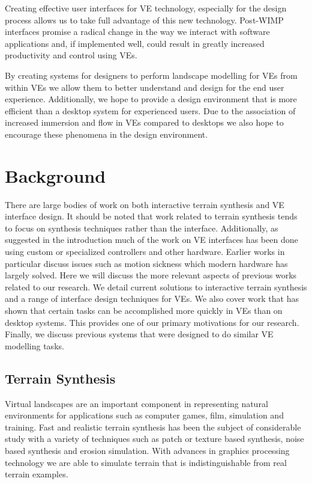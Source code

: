 \documentclass{sig-alternate-05-2015}
\begin{document}
Creating effective user interfaces for VE technology, especially for the design process allows us to take full advantage of this new technology. Post-WIMP interfaces promise a radical change in the way we interact with software applications and, if implemented well, could result in greatly increased productivity and control using VEs.
 
 By creating systems for designers to perform landscape modelling for VEs from within VEs we allow them to better understand and design for the end user experience. Additionally, we hope to provide a design environment that is more efficient than a desktop system for experienced users. Due to the association of increased immersion and flow in VEs compared to desktops\cite{Schubert2001} we also hope to encourage these phenomena in the design environment.
\section{Background}
There are large bodies of work on both interactive terrain synthesis and VE interface design. It should be noted that work related to terrain synthesis tends to focus on synthesis techniques rather than the interface. Additionally, as suggested in the introduction much of the work on VE interfaces has been done using custom or specialized controllers and other hardware. Earlier works in particular discuss issues such as motion sickness which modern hardware has largely solved. Here we will discuss the more relevant aspects of previous works related to our research. We detail current solutions to interactive terrain synthesis and a range of interface design techniques for VEs. We also cover work that has shown that certain tasks can be accomplished more quickly in VEs than on desktop systems. This provides one of our primary motivations for our research. Finally, we discuss previous systems that were designed to do similar VE modelling tasks. 
\subsection{Terrain Synthesis} 
Virtual landscapes are an important component in representing natural environments for applications such as computer games, film, simulation and training\cite{Gain2015}. Fast and realistic terrain synthesis has been the subject of considerable study with a variety of techniques such as patch or texture based synthesis\cite{Cruz2015, Tasse2012}, noise based synthesis\cite{Musgrave1989} and erosion simulation\cite{Anh2007}. With advances in graphics processing technology we are able to simulate terrain that is indistinguishable from real terrain examples\cite{Gain2015}. 
\end{document}
